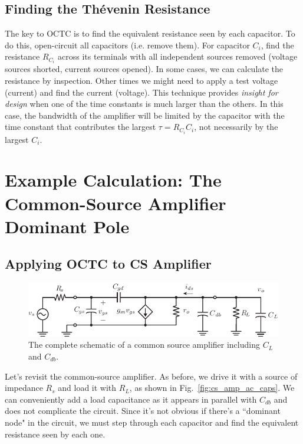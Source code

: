 \subsection{Finding the Thévenin Resistance}

The key to OCTC is to find the equivalent resistance seen by each capacitor.  To do this, open-circuit all capacitors (i.e. remove them).  For capacitor $C_i$, find the resistance $R_{C_i}$ across its terminals with all independent sources removed (voltage sources shorted, current sources opened).  In some cases, we can calculate the resistance by inspection. Other times we might need to apply a test voltage (current) and find the current (voltage).  This technique provides \textit{insight for design} when one of the time constants is much larger than the others.  In this case, the bandwidth of the amplifier will be limited by the capacitor with the time constant that contributes the largest $\tau = R_{C_i} C_i$, not necessarily by the largest $C_i$.
 


\section{Example Calculation:  The Common-Source Amplifier Dominant Pole}


\subsection{Applying OCTC to CS Amplifier}

\begin{figure}[tb]
\begin{center}
\includegraphics[scale=1]{cs_amp_ac_caps}
\end{center}
\caption{The complete schematic of a common source amplifier including $C_L$ and $C_{db}$.} \label{fig:cs_amp_ac_caps2}
\end{figure}

Let's revisit the common-source amplifier.  As before, we drive it with a source of impedance $R_s$ and load it with $R_L$, as shown in Fig.~\ref{fig:cs_amp_ac_caps}.  We can conveniently add a load capacitance as it appears in parallel with $C_{db}$ and does not complicate the circuit. Since it's not obvious if there's a ``dominant node" in the circuit, we must step through each capacitor and find the equivalent resistance seen by each one. 



